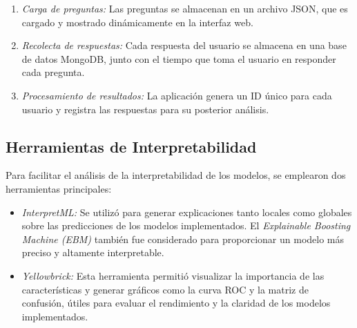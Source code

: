 \begin{enumerate}
    \item \textit{Carga de preguntas:} Las preguntas se almacenan en un archivo JSON, que es cargado y mostrado dinámicamente en la interfaz web.
    \item \textit{Recolecta de respuestas:} Cada respuesta del usuario se almacena en una base de datos MongoDB, junto con el tiempo que toma el usuario en responder cada pregunta.
    \item \textit{Procesamiento de resultados:} La aplicación genera un ID único para cada usuario y registra las respuestas para su posterior análisis.
\end{enumerate}

\subsection{Herramientas de Interpretabilidad}
Para facilitar el análisis de la interpretabilidad de los modelos, se emplearon dos herramientas principales:

\begin{itemize}
    \item \textit{InterpretML:} Se utilizó para generar explicaciones tanto locales como globales sobre las predicciones de los modelos implementados. El \textit{Explainable Boosting Machine (EBM)} también fue considerado para proporcionar un modelo más preciso y altamente interpretable.
    \item \textit{Yellowbrick:} Esta herramienta permitió visualizar la importancia de las características y generar gráficos como la curva ROC y la matriz de confusión, útiles para evaluar el rendimiento y la claridad de los modelos implementados.
\end{itemize}
